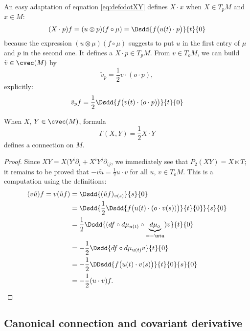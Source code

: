 An easy adaptation of equation \eqref{eq:defcdotXY} defines $X\cdot x$ when $X\in T_pM$ and $x\in M$:
\begin{equation}
(X\cdot p)f=(u\otimes p)(f\circ\mu)=\Dsdd{ f\big( u(t)\cdot p \big) }{t}{0}
\end{equation}
because the expression $(u\otimes\mu)(f\circ \mu)$ suggests to put $u$ in the first entry of $\mu$ and $p$ in the second one.
It defines a $X\cdot p\in T_pM$. From $v\in T_oM$, we can build $\tilde v\in\cvec(M)$ by
\begin{equation}
  \tilde v_p=\frac{1}{2}v\cdot(o\cdot p),
\end{equation}
explicitly:
\[ 
  \tilde v_pf=\frac{1}{2}\Dsdd{ f\big( v(t)\cdot(o\cdot p) \big) }{t}{0}
\]

\begin{theorem}
  When $X$, $Y\in\cvec(M)$, formula
\begin{equation}
   \Gamma(X,Y)=\frac{1}{2}X\cdot Y
\end{equation}
defines a connection on $M$.

\end{theorem}

\begin{proof}
 Since $XY=X(Y^i\partial_i+X^iY^j\partial_{ij}$, we immediately see that  $P_2(XY)=X\ltimes T$;
it remains to be proved that $-v\tilde u=\frac{1}{2}u\cdot v$ for all $u$, $v\in T_oM$. This is a computation using the definitions:
\begin{equation}
\begin{split}
   (v\tilde u)f=v(\tilde u f)&=\Dsdd{ (\tilde u f)_{v(s)} }{s}{0}\\
		&=\Dsdd{     \frac{1}{2}\Dsdd{ f\big( u(t)\cdot (o\cdot v(s)) \big) }{t}{0}       }{s}{0}\\
		&=\frac{1}{2}\Dsdd{   (df\circ d\mu_{u(t)}\circ \underbrace{d\mu_o}_{=-\mtu})v   }{t}{0}\\
		&=-\frac{1}{2}\Dsdd{ df\circ d\mu_{u(t)}v }{t}{0}\\
		&=-\frac{1}{2} \DDsdd{ f\big( u(t)\cdot v(s) \big) }{t}{0}{s}{0}\\
		&=-\frac{1}{2}(u\cdot v)f.
\end{split}
\end{equation}
\end{proof}

\subsection{Canonical connection and covariant derivative}  \label{subsecCanConCovDer}

